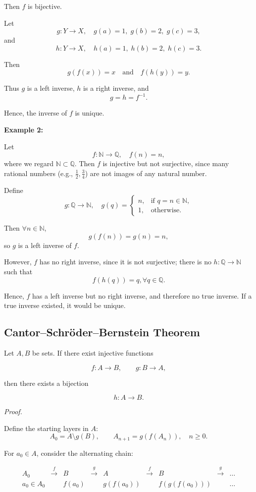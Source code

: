 \documentclass[12pt,a4paper,openany]{article}
\begin{document}
Then $f$ is bijective.

Let  
\[
g : Y \to X, \quad g(a) = 1, \; g(b) = 2, \; g(c) = 3,
\]
and  
\[
h : Y \to X, \quad h(a) = 1, \; h(b) = 2, \; h(c) = 3.
\]

Then  
\[
g(f(x)) = x \quad \text{and} \quad f(h(y)) = y.
\]

Thus $g$ is a left inverse, $h$ is a right inverse, and  
\[
g = h = f^{-1}.
\]

Hence, the inverse of $f$ is unique.

\textbf{Example 2:} 

Let  
\[
f : \mathbb{N} \to \mathbb{Q}, \quad f(n) = n,
\]
where we regard $\mathbb{N} \subset \mathbb{Q}$. Then $f$ is injective but not surjective, since many rational numbers (e.g., $\frac{1}{2}, \frac{3}{4}$) are not images of any natural number.

Define  
\[
g : \mathbb{Q} \to \mathbb{N}, \quad
g(q) = 
\begin{cases}
n, & \text{if } q = n \in \mathbb{N}, \\
1, & \text{otherwise}.
\end{cases}
\]

Then $\forall n \in \mathbb{N}$,  
\[
g(f(n)) = g(n) = n,
\]
so $g$ is a left inverse of $f$.

However, $f$ has no right inverse, since it is not surjective; there is no $h : \mathbb{Q} \to \mathbb{N}$ such that  
\[
f(h(q)) = q, \forall q \in \mathbb{Q}.
\]

Hence, $f$ has a left inverse but no right inverse, and therefore no true inverse. If a true inverse existed, it would be unique.


\subsection{Cantor--Schröder--Bernstein Theorem}

Let $A,B$ be sets. If there exist injective functions  

\[
f: A \to B, \qquad g: B \to A,
\]

then there exists a bijection  

\[
h: A \to B.
\]

\textit{Proof.}

Define the starting layers in $A$:
\[
A_0 = A \setminus g(B), \qquad
A_{n+1} = g(f(A_n)), \quad n \ge 0.
\]

For $a_0 \in A$, consider the alternating chain:

\[
\begin{array}{ccccccccc}
{A_0} & \xrightarrow{\,f\,} & B & \xrightarrow{\,g\,} & A & \xrightarrow{\,f\,} & B & \xrightarrow{\,g\,} & \dots \\
a_0 \in A_0 & & f(a_0) & & g(f(a_0)) & & f(g(f(a_0))) & & \dots
\end{array}
\]
\end{document}

